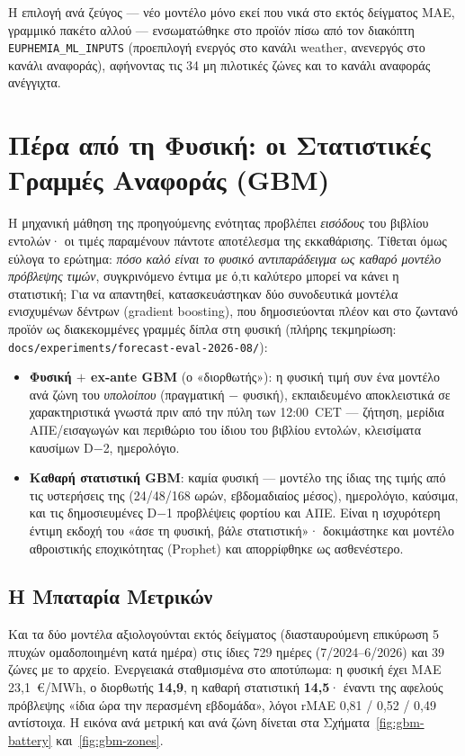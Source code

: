 Η επιλογή ανά ζεύγος --- νέο μοντέλο μόνο εκεί που νικά στο εκτός δείγματος MAE, γραμμικό πακέτο αλλού --- ενσωματώθηκε στο προϊόν πίσω από τον διακόπτη \texttt{EUPHEMIA\_ML\_INPUTS} (προεπιλογή ενεργός στο κανάλι weather, ανενεργός στο κανάλι αναφοράς), αφήνοντας τις 34 μη πιλοτικές ζώνες και το κανάλι αναφοράς ανέγγιχτα.


\section{Πέρα από τη Φυσική: οι Στατιστικές Γραμμές Αναφοράς (GBM)}
\label{sec:gbm-lines}

Η μηχανική μάθηση της προηγούμενης ενότητας προβλέπει \emph{εισόδους} του βιβλίου εντολών· οι τιμές παραμένουν πάντοτε αποτέλεσμα της εκκαθάρισης. Τίθεται όμως εύλογα το ερώτημα: \emph{πόσο καλό είναι το φυσικό αντιπαράδειγμα ως καθαρό μοντέλο πρόβλεψης τιμών}, συγκρινόμενο έντιμα με ό,τι καλύτερο μπορεί να κάνει η στατιστική; Για να απαντηθεί, κατασκευάστηκαν δύο συνοδευτικά μοντέλα ενισχυμένων δέντρων (gradient boosting), που δημοσιεύονται πλέον και στο ζωντανό προϊόν ως διακεκομμένες γραμμές δίπλα στη φυσική (πλήρης τεκμηρίωση: \texttt{docs/experiments/forecast-eval-2026-08/}):

\begin{itemize}
\item \textbf{Φυσική $+$ ex-ante GBM} (ο «διορθωτής»): η φυσική τιμή συν ένα μοντέλο ανά ζώνη του \emph{υπολοίπου} (πραγματική $-$ φυσική), εκπαιδευμένο αποκλειστικά σε χαρακτηριστικά γνωστά πριν από την πύλη των 12:00~CET --- ζήτηση, μερίδια ΑΠΕ/εισαγωγών και περιθώριο του ίδιου του βιβλίου εντολών, κλεισίματα καυσίμων D$-$2, ημερολόγιο.
\item \textbf{Καθαρή στατιστική GBM}: καμία φυσική --- μοντέλο της ίδιας της τιμής από τις υστερήσεις της (24/48/168 ωρών, εβδομαδιαίος μέσος), ημερολόγιο, καύσιμα, και τις δημοσιευμένες D$-$1 προβλέψεις φορτίου και ΑΠΕ. Είναι η ισχυρότερη έντιμη εκδοχή του «άσε τη φυσική, βάλε στατιστική»· δοκιμάστηκε και μοντέλο αθροιστικής εποχικότητας (Prophet) και απορρίφθηκε ως ασθενέστερο.
\end{itemize}

\subsection{Η Μπαταρία Μετρικών}
\label{subsec:gbm-battery}

Και τα δύο μοντέλα αξιολογούνται εκτός δείγματος (διασταυρούμενη επικύρωση 5 πτυχών ομαδοποιημένη κατά ημέρα) στις ίδιες 729 ημέρες (7/2024--6/2026) και 39 ζώνες με το αρχείο. Ενεργειακά σταθμισμένα στο αποτύπωμα: η φυσική έχει MAE 23,1~€/MWh, ο διορθωτής \textbf{14,9}, η καθαρή στατιστική \textbf{14,5}· έναντι της αφελούς πρόβλεψης «ίδια ώρα την περασμένη εβδομάδα», λόγοι rMAE 0,81 / 0,52 / 0,49 αντίστοιχα. Η εικόνα ανά μετρική και ανά ζώνη δίνεται στα Σχήματα~\ref{fig:gbm-battery} και~\ref{fig:gbm-zones}.

